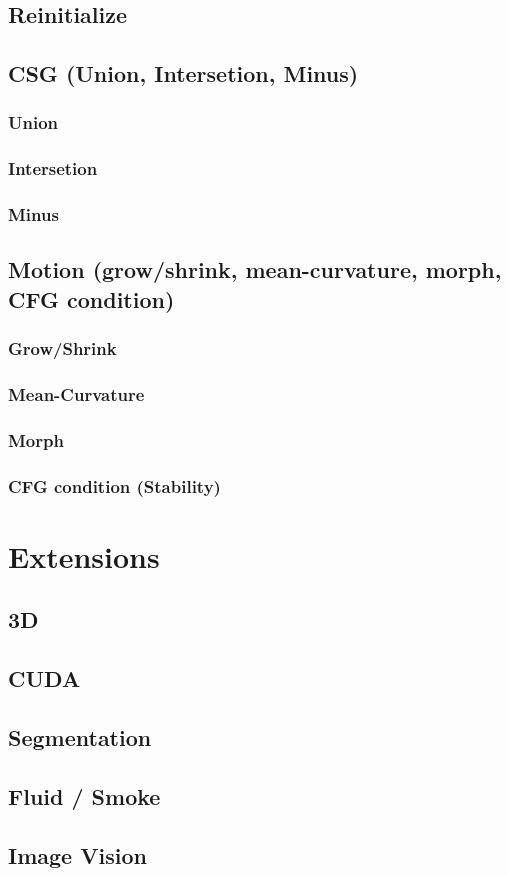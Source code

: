 \documentclass[a4paper]{memoir}
\begin{document}
\section{Reinitialize}

\section{CSG (Union, Intersetion, Minus)}
\subsection{Union}
\subsection{Intersetion}
\subsection{Minus}

\section{Motion (grow/shrink, mean-curvature, morph, CFG condition)}
\subsection{Grow/Shrink}
\subsection{Mean-Curvature}
\subsection{Morph}
\subsection{CFG condition (Stability)}

\chapter{Extensions}

\section{3D}
\section{CUDA}

\section{Segmentation}
\section{Fluid / Smoke}
\section{Image Vision}
\end{document}
